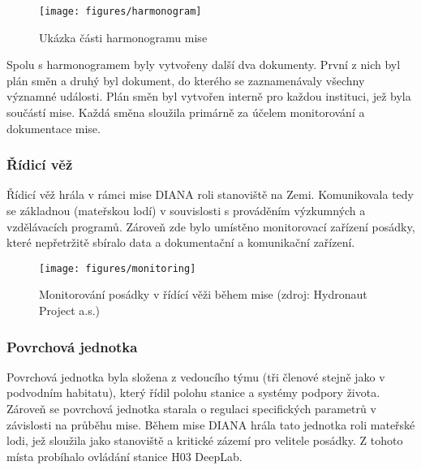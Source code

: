 \begin{figure}[h]
    \begin{center}
        \begin{framed}
            \texttt{[image: figures/harmonogram]}
        \end{framed}
        \caption{Ukázka části harmonogramu mise}
        \label{fig:harmonogram}
    \end{center}
\end{figure}

Spolu s harmonogramem byly vytvořeny další dva dokumenty. První z nich byl plán
směn a druhý byl dokument, do kterého se zaznamenávaly všechny významné
události. Plán směn byl vytvořen interně pro každou instituci, jež byla součástí
mise. Každá směna sloužila primárně za účelem monitorování a dokumentace mise.

\subsubsection{Řídicí věž}
\label{subsubsec:ridici_vez}
Řídicí věž hrála v rámci mise DIANA roli stanoviště na Zemi. Komunikovala tedy
se základnou (mateřskou lodí) v souvislosti s prováděním výzkumných a
vzdělávacích programů. Zároveň zde bylo umístěno monitorovací zařízení posádky,
které nepřetržitě sbíralo data a dokumentační a komunikační zařízení.

\begin{figure}[h]
    \begin{center}
        \texttt{[image: figures/monitoring]}
        \caption{Monitorování posádky v řídící věži během mise (zdroj: Hydronaut Project a.s.)}
        \label{fig:monitoring}
    \end{center}
\end{figure}

\subsubsection{Povrchová jednotka}
\label{subsubsec:povrchova_jednotka}
Povrchová jednotka byla složena z vedoucího týmu (tři členové stejně jako v
podvodním habitatu), který řídil polohu stanice a systémy podpory života.
Zároveň se povrchová jednotka starala o regulaci specifických parametrů v
závislosti na průběhu mise. Během mise DIANA hrála tato jednotka roli mateřské
lodi, jež sloužila jako stanoviště a kritické zázemí pro velitele posádky. Z
tohoto místa probíhalo ovládání stanice H03 DeepLab.

